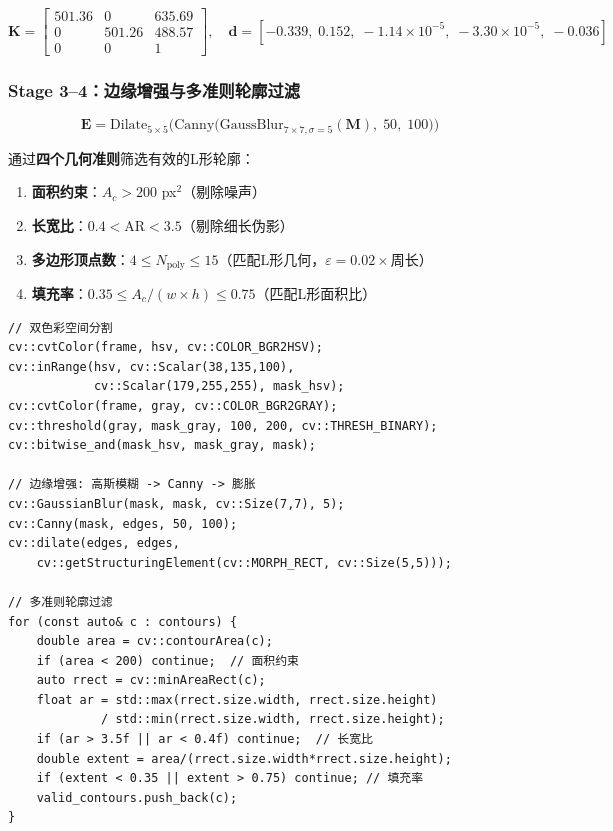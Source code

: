 \documentclass[12pt,a4paper]{ctexart}
\begin{document}
\begin{equation}
    \mathbf{K} = \begin{bmatrix} 501.36 & 0 & 635.69 \\ 0 & 501.26 & 488.57 \\ 0 & 0 & 1 \end{bmatrix}, \quad
    \mathbf{d} = [-0.339,\; 0.152,\; -1.14\!\times\!10^{-5},\; -3.30\!\times\!10^{-5},\; -0.036]
\end{equation}

\subsubsection{Stage 3--4：边缘增强与多准则轮廓过滤}

\begin{equation}
    \mathbf{E} = \text{Dilate}_{5\times5}\Big(\text{Canny}\big(\text{GaussBlur}_{7\times7,\sigma=5}(\mathbf{M}),\; 50,\; 100\big)\Big)
\end{equation}

通过\textbf{四个几何准则}筛选有效的L形轮廓：

\begin{enumerate}
    \item \textbf{面积约束}：$A_c > 200$ px$^2$（剔除噪声）
    \item \textbf{长宽比}：$0.4 < \text{AR} < 3.5$（剔除细长伪影）
    \item \textbf{多边形顶点数}：$4 \leq N_{\text{poly}} \leq 15$（匹配L形几何，$\varepsilon = 0.02 \times$周长）
    \item \textbf{填充率}：$0.35 \leq A_c/(w \times h) \leq 0.75$（匹配L形面积比）
\end{enumerate}

\begin{lstlisting}[style=cppstyle, caption={HSV分割+Canny边缘+多准则轮廓过滤}]
// 双色彩空间分割
cv::cvtColor(frame, hsv, cv::COLOR_BGR2HSV);
cv::inRange(hsv, cv::Scalar(38,135,100),
            cv::Scalar(179,255,255), mask_hsv);
cv::cvtColor(frame, gray, cv::COLOR_BGR2GRAY);
cv::threshold(gray, mask_gray, 100, 200, cv::THRESH_BINARY);
cv::bitwise_and(mask_hsv, mask_gray, mask);

// 边缘增强: 高斯模糊 -> Canny -> 膨胀
cv::GaussianBlur(mask, mask, cv::Size(7,7), 5);
cv::Canny(mask, edges, 50, 100);
cv::dilate(edges, edges,
    cv::getStructuringElement(cv::MORPH_RECT, cv::Size(5,5)));

// 多准则轮廓过滤
for (const auto& c : contours) {
    double area = cv::contourArea(c);
    if (area < 200) continue;  // 面积约束
    auto rrect = cv::minAreaRect(c);
    float ar = std::max(rrect.size.width, rrect.size.height)
             / std::min(rrect.size.width, rrect.size.height);
    if (ar > 3.5f || ar < 0.4f) continue;  // 长宽比
    double extent = area/(rrect.size.width*rrect.size.height);
    if (extent < 0.35 || extent > 0.75) continue; // 填充率
    valid_contours.push_back(c);
}
\end{lstlisting}
\end{document}
